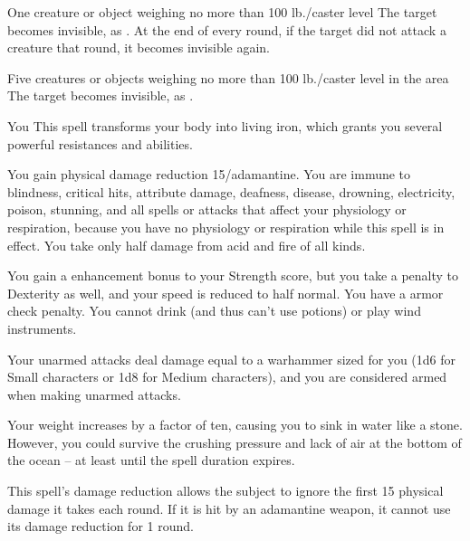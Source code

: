 \spellrng{\rngclose}
\spelldur{\durshort \dismissable}
\begin{spelltarget}{One creature or object weighing no more than 100 lb./caster level}
    \spelleffect The target becomes invisible, as . At the end of every round, if the target did not attack a creature that round, it becomes invisible again.
\end{spelltarget}

\spelldur{\durshort \dismissable}
\begin{spelltargets}{Five creatures or objects weighing no more than 100 lb./caster level in the area}
    \spelleffect The target becomes invisible, as .
\end{spelltargets}

\spelldur{\durshort \dismissable}
\begin{spelltarget}{You}
    \spelleffect This spell transforms your body into living iron, which grants you several powerful resistances and abilities.
\par You gain physical damage reduction 15/adamantine. You are immune to blindness, critical hits, attribute damage, deafness, disease, drowning, electricity, poison, stunning, and all spells or attacks that affect your physiology or respiration, because you have no physiology or respiration while this spell is in effect. You take only half damage from acid and fire of all kinds.
\par You gain a  enhancement bonus to your Strength score, but you take a  penalty to Dexterity as well, and your speed is reduced to half normal. You have a  armor check penalty. You cannot drink (and thus can't use potions) or play wind instruments.
\par Your unarmed attacks deal damage equal to a warhammer sized for you (1d6 for Small characters or 1d8 for Medium characters), and you are considered armed when making unarmed attacks.
\par Your weight increases by a factor of ten, causing you to sink in water like a stone. However, you could survive the crushing pressure and lack of air at the bottom of the ocean -- at least until the spell duration expires.
\end{spelltarget}
\spellnotes This spell's damage reduction allows the subject to ignore the first 15 physical damage it takes each round. If it is hit by an adamantine weapon, it cannot use its damage reduction for 1 round.

